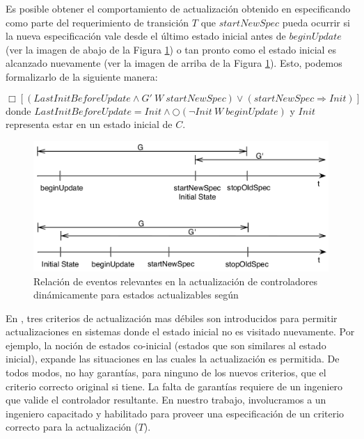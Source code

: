 Es posible obtener el comportamiento de actualización obtenido en \cite{6224401} especificando como parte del
requerimiento de transición $T$ que $startNewSpec$ pueda ocurrir si la nueva especificación vale desde el último estado
inicial antes de $beginUpdate$ (ver la imagen de abajo de la Figura \ref{ghezzi}) o tan pronto como el estado inicial es
alcanzado nuevamente (ver la imagen de arriba de la Figura \ref{ghezzi}). Esto, podemos formalizarlo de la siguiente manera:

\vspace{-1cm}
\begin{equation}
\label{ghezzi_formula}
\Box [(LastInitBeforeUpdate \wedge G'\ W\ startNewSpec) \lor (startNewSpec \Longrightarrow Init)]
\end{equation}
\noindent donde $LastInitBeforeUpdate = Init \wedge \bigcirc(\neg Init\ W\ beginUpdate)$ y $Init$ representa estar en un estado inicial de
$C$.


\begin{figure}
\centering
\includegraphics[scale=0.35]{img/Ghezzi.png}
\caption{Relación de eventos relevantes en la actualización de controladores dinámicamente para estados actualizables
según \cite{6224401}}
\label{ghezzi}
\end{figure}

En \cite{PanzicaLaManna:2013:FCC:2487336.2487349}, tres criterios de actualización mas débiles son introducidos para
permitir actualizaciones en sistemas donde el estado inicial no es visitado nuevamente. Por ejemplo, la noción de
estados co-inicial (estados que son similares al estado inicial), expande las situaciones en las cuales la actualización
es permitida. De todos modos, no hay garantías, para ninguno de los nuevos criterios, que el criterio correcto original
si tiene. La falta de garantías requiere de un ingeniero que valide el controlador resultante. En nuestro trabajo,
involucramos a un ingeniero capacitado y habilitado para proveer una especificación de un criterio correcto para la
actualización ($T$).

